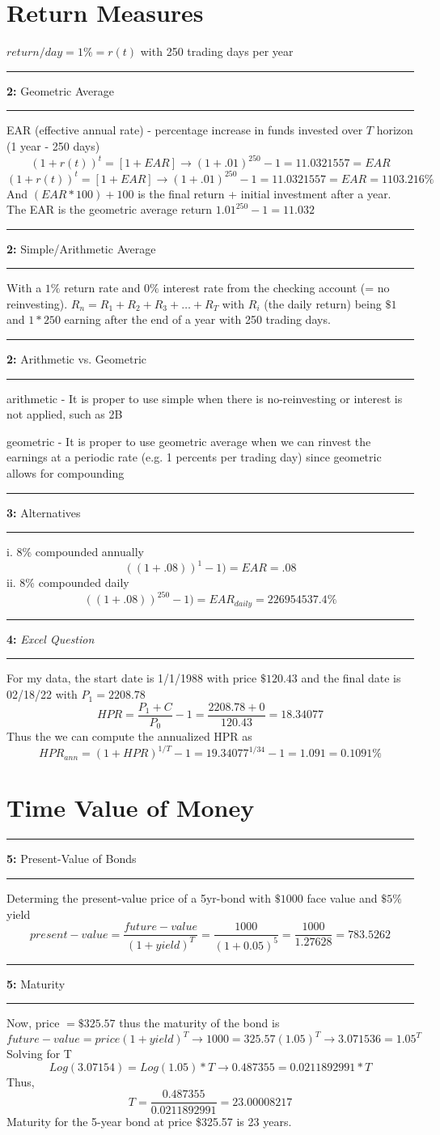 \documentclass[11pt]{article}
\newcommand\question[2]{\vspace{.25in}\hrule\textbf{#1: } #2\vspace{.5em}\hrule\vspace{.10in}}
\begin{document}
\section{Return Measures}
$return/day = 1\% = r(t)$ with 250 trading days per year
\question{2}{Geometric Average} 
EAR (effective annual rate) - percentage increase in funds invested over $T$ horizon (1 year - 250 days)
$$ 
(1 + r(t))^{t} = [1+EAR] \rightarrow
(1 + .01)^{250} - 1 = 11.0321557 = EAR
$$ 
$$ 
(1 + r(t))^{t} = [1+EAR] \rightarrow
(1 + .01)^{250} - 1 = 11.0321557 = EAR = 1103.216\%
$$ 
And $(EAR*100) + 100$ is the final return + initial investment after a year. \\ 
The EAR is the geometric average return $1.01^{250} - 1 = 11.032$


\question{2}{Simple/Arithmetic Average}
With a $1\%$ return rate and $0\%$ interest rate from the checking account (= no reinvesting). 
$R_n = R_1+R_2+R_3+\dots+R_T$ with $R_i$ (the daily return) being $\$1$ and $1*250$  earning after the end of a year with 250 trading days.

\question{2}{Arithmetic vs. Geometric}
arithmetic - It is proper to use simple when there is no-reinvesting or interest is not applied, such as 2B

geometric - It is proper to use geometric average when we can rinvest the earnings at a periodic rate (e.g. 1 percents per trading day)
since geometric allows for compounding

\question{3}{Alternatives} 
i. 8\% compounded annually 
$$
((1 + .08))^{1}-1) = EAR = .08
$$
ii. 8\% compounded daily
$$
((1 + .08))^{250}-1) = EAR_{daily} = 226954537.4\%
$$
\question{4}{\textit{Excel Question}} 
For my data, the start date is 1/1/1988 with price $\$120.43$ and the final date is 02/18/22 with $P_1 = 2208.78$
\[
    HPR = \frac{P_1 + C}{P_0} - 1 = \frac{2208.78 + 0}{120.43} = 18.34077
\]
Thus the we can compute the annualized HPR as 
\[
    HPR_{ann} = (1+HPR)^{1/T} - 1 = 19.34077^{1/34} - 1 = 1.091 = 0.1091\%
\]

\section{Time Value of Money}
\question{5}{Present-Value of Bonds} 
Determing the present-value price of a 5yr-bond with $\$1000$ face value and $\$5\%$ yield
\[
   present-value = \frac{future-value}{(1+yield)^T} = \frac{1000}{(1+0.05)^5} = \frac{1000}{1.27628} = 783.5262
\]

\question{5}{Maturity} 
Now, price $=\$325.57$ thus the maturity of the bond is 
\[
    future-value = price(1+yield)^T \rightarrow 1000 = 325.57(1.05)^T \rightarrow 3.071536 = 1.05^T
\]
Solving for T
\[
   Log(3.07154) = Log(1.05) * T \rightarrow 0.487355 = 0.0211892991 * T 
\]
Thus, 
\[
    T = \frac{0.487355}{0.0211892991} = 23.00008217
\]
Maturity for the 5-year bond at price \$325.57 is 23 years.
\end{document}
